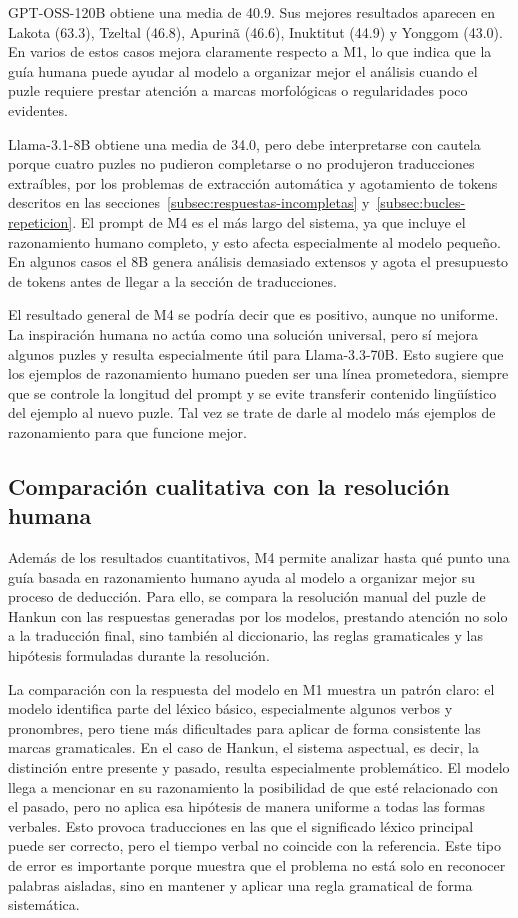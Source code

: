 GPT-OSS-120B obtiene una media de 40.9. Sus mejores resultados aparecen en Lakota (63.3), Tzeltal (46.8), Apurinã (46.6), Inuktitut (44.9) y Yonggom (43.0). En varios de estos casos mejora claramente respecto a M1, lo que indica que la guía humana puede ayudar al modelo a organizar mejor el análisis cuando el puzle requiere prestar atención a marcas morfológicas o regularidades poco evidentes.

Llama-3.1-8B obtiene una media de 34.0, pero debe interpretarse con cautela porque cuatro puzles no pudieron completarse o no produjeron traducciones extraíbles, por los problemas de extracción automática y agotamiento de tokens descritos en las secciones~\ref{subsec:respuestas-incompletas} y~\ref{subsec:bucles-repeticion}. El prompt de M4 es el más largo del sistema, ya que incluye el razonamiento humano completo, y esto afecta especialmente al modelo pequeño. En algunos casos el 8B genera análisis demasiado extensos y agota el presupuesto de tokens antes de llegar a la sección de traducciones.

El resultado general de M4 se podría decir que es positivo, aunque no uniforme. La inspiración humana no actúa como una solución universal, pero sí mejora algunos puzles y resulta especialmente útil para Llama-3.3-70B. Esto sugiere que los ejemplos de razonamiento humano pueden ser una línea prometedora, siempre que se controle la longitud del prompt y se evite transferir contenido lingüístico del ejemplo al nuevo puzle. Tal vez se trate de darle al modelo más ejemplos de razonamiento para que funcione mejor.

\subsection{Comparación cualitativa con la resolución humana}
\label{subsec:m4-comparacion-humana}

Además de los resultados cuantitativos, M4 permite analizar hasta qué punto una guía basada en razonamiento humano ayuda al modelo a organizar mejor su proceso de deducción. Para ello, se compara la resolución manual del puzle de Hankun con las respuestas generadas por los modelos, prestando atención no solo a la traducción final, sino también al diccionario, las reglas gramaticales y las hipótesis formuladas durante la resolución.

La comparación con la respuesta del modelo en M1 muestra un patrón claro: el modelo identifica parte del léxico básico, especialmente algunos verbos y pronombres, pero tiene más dificultades para aplicar de forma consistente las marcas gramaticales. En el caso de Hankun, el sistema aspectual, es decir, la distinción entre presente y pasado, resulta especialmente problemático. El modelo llega a mencionar en su razonamiento la posibilidad de que  esté relacionado con el pasado, pero no aplica esa hipótesis de manera uniforme a todas las formas verbales. Esto provoca traducciones en las que el significado léxico principal puede ser correcto, pero el tiempo verbal no coincide con la referencia. Este tipo de error es importante porque muestra que el problema no está solo en reconocer palabras aisladas, sino en mantener y aplicar una regla gramatical de forma sistemática.

